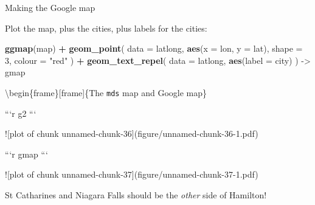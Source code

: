\documentclass[ignorenonframetext,]{beamer}
\newenvironment{Shaded}{\begin{snugshade}}{\end{snugshade}}
\newcommand{\DataTypeTok}[1]{\textcolor[rgb]{0.13,0.29,0.53}{#1}}
\newcommand{\DecValTok}[1]{\textcolor[rgb]{0.00,0.00,0.81}{#1}}
\newcommand{\KeywordTok}[1]{\textcolor[rgb]{0.13,0.29,0.53}{\textbf{#1}}}
\newcommand{\NormalTok}[1]{#1}
\newcommand{\OperatorTok}[1]{\textcolor[rgb]{0.81,0.36,0.00}{\textbf{#1}}}
\newcommand{\StringTok}[1]{\textcolor[rgb]{0.31,0.60,0.02}{#1}}
\begin{document}
\begin{frame}[fragile]{Making the Google map}
\protect\hypertarget{making-the-google-map}{}

Plot the map, plus the cities, plus labels for the cities:

\begin{Shaded}
\begin{Highlighting}[]
\KeywordTok{ggmap}\NormalTok{(map) }\OperatorTok{+}
\StringTok{  }\KeywordTok{geom_point}\NormalTok{(}
    \DataTypeTok{data =}\NormalTok{ latlong,}
    \KeywordTok{aes}\NormalTok{(}\DataTypeTok{x =}\NormalTok{ lon, }\DataTypeTok{y =}\NormalTok{ lat),}
    \DataTypeTok{shape =} \DecValTok{3}\NormalTok{, }\DataTypeTok{colour =} \StringTok{"red"}
\NormalTok{  ) }\OperatorTok{+}
\StringTok{  }\KeywordTok{geom_text_repel}\NormalTok{(}
    \DataTypeTok{data =}\NormalTok{ latlong,}
    \KeywordTok{aes}\NormalTok{(}\DataTypeTok{label =}\NormalTok{ city)}
\NormalTok{  ) ->}\StringTok{ }\NormalTok{gmap}
\end{Highlighting}
\end{Shaded}

\textbackslash{}begin\{frame\}{[}frame{]}\{The \texttt{mds} map and
Google map\}

\begin{multicols}{2}

```r
g2
```

![plot of chunk unnamed-chunk-36](figure/unnamed-chunk-36-1.pdf)

     


```r
gmap
```

![plot of chunk unnamed-chunk-37](figure/unnamed-chunk-37-1.pdf)

 
\end{multicols}

St Catharines and Niagara Falls should be the \emph{other} side of
Hamilton!

\end{frame}
\end{document}
